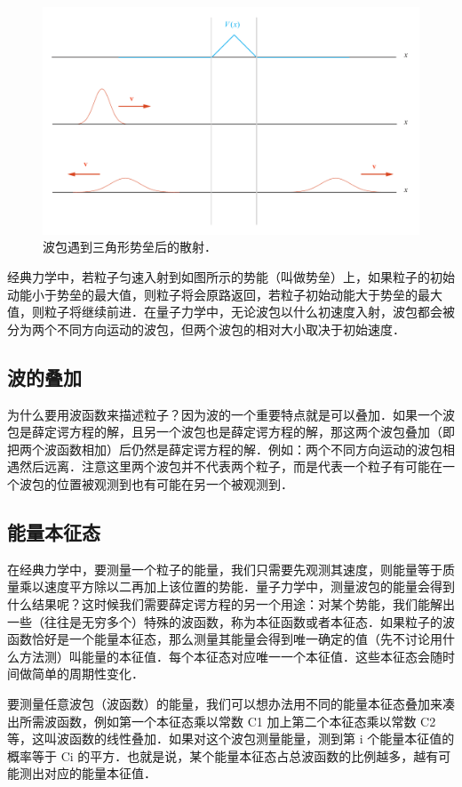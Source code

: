 \begin{figure}[ht]
\centering
\includegraphics[width=14cm]{./figures/QM03.pdf}
\caption{波包遇到三角形势垒后的散射．} \label{QM0_fig3}
\end{figure}

经典力学中，若粒子匀速入射到如图所示的势能（叫做势垒）上，如果粒子的初始动能小于势垒的最大值，则粒子将会原路返回，若粒子初始动能大于势垒的最大值，则粒子将继续前进．在量子力学中，无论波包以什么初速度入射，波包都会被分为两个不同方向运动的波包，但两个波包的相对大小取决于初始速度．

\subsection{波的叠加}
为什么要用波函数来描述粒子？因为波的一个重要特点就是可以叠加．如果一个波包是薛定谔方程的解，且另一个波包也是薛定谔方程的解，那这两个波包叠加（即把两个波函数相加）后仍然是薛定谔方程的解．例如：两个不同方向运动的波包相遇然后远离．注意这里两个波包并不代表两个粒子，而是代表一个粒子有可能在一个波包的位置被观测到也有可能在另一个被观测到．

\subsection{能量本征态}
在经典力学中，要测量一个粒子的能量，我们只需要先观测其速度，则能量等于质量乘以速度平方除以二再加上该位置的势能．量子力学中，测量波包的能量会得到什么结果呢？这时候我们需要薛定谔方程的另一个用途：对某个势能，我们能解出一些（往往是无穷多个）特殊的波函数，称为本征函数或者本征态．如果粒子的波函数恰好是一个能量本征态，那么测量其能量会得到唯一确定的值（先不讨论用什么方法测）叫能量的本征值．每个本征态对应唯一一个本征值．这些本征态会随时间做简单的周期性变化．

要测量任意波包（波函数）的能量，我们可以想办法用不同的能量本征态叠加来凑出所需波函数，例如第一个本征态乘以常数 C1 加上第二个本征态乘以常数 C2 等，这叫波函数的线性叠加．如果对这个波包测量能量，测到第 i 个能量本征值的概率等于 Ci 的平方．也就是说，某个能量本征态占总波函数的比例越多，越有可能测出对应的能量本征值．

